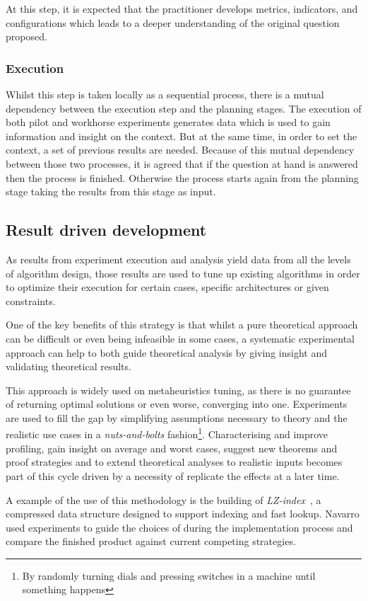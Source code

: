 At this step, it is expected that the practitioner develops metrics, indicators, and configurations which leads to a deeper understanding of the original question proposed.

\subsubsection{Execution}
Whilst this step is taken locally as a sequential process, there is a mutual dependency between the execution step and the planning stages. The execution of both pilot and workhorse experiments generates data which is used to gain information and insight on the context. But at the same time, in order to set the context, a set of previous results are needed. Because of this mutual dependency between those two processes, it is agreed that if the question at hand is answered then the process is finished. Otherwise the process starts again from the planning stage taking the results from this stage as input.

\subsection{Result driven development}
As results from experiment execution and analysis yield data from all the levels of algorithm design, those results are used to tune up existing algorithms in order to optimize their execution for certain cases, specific architectures or given constraints.

One of the key benefits of this strategy is that whilst a pure theoretical approach can be difficult or even being infeasible in some cases, a systematic experimental approach can help to both guide theoretical analysis by giving insight and validating theoretical results.

This approach is widely used on metaheuristics tuning, as there is no guarantee of returning optimal solutions or even worse, converging into one. Experiments are used to fill the gap by simplifying assumptions necessary to theory and the realistic use cases in a \emph{nuts-and-bolts} fashion\footnote{By randomly turning dials and pressing switches in a machine until something happens}. Characterising and improve profiling, gain insight on average and worst cases, suggest new theorems and proof strategies and to extend theoretical analyses to realistic inputs becomes part of this cycle driven by a necessity of replicate the effects at a later time.

A example of the use of this methodology is the building of \textit{LZ-index}~\cite{Navarro_2009}, a compressed data structure designed to support indexing and fast lookup. Navarro used experiments to guide the choices of during the implementation process and compare the finished product against current competing strategies.
